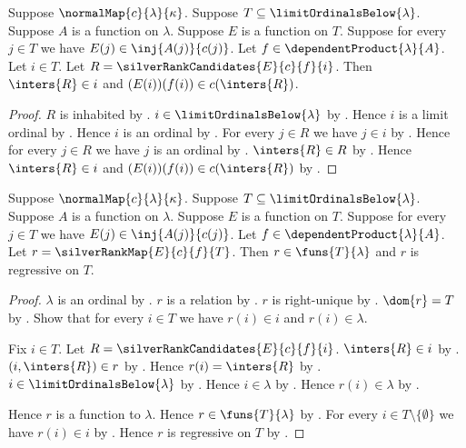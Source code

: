 \begin{proposition}\label{silver_rank_value_properties}
    Suppose $\normalMap{c}{\lambda}{\kappa}$.
    Suppose $T\subseteq\limitOrdinalsBelow{\lambda}$.
    Suppose $A$ is a function on $\lambda$.
    Suppose $E$ is a function on $T$.
    Suppose for every $j\in T$ we have
        $E(j)\in\inj{A(j)}{c(j)}$.
    Let $f\in\dependentProduct{\lambda}{A}$.
    Let $i\in T$.
    Let $R=\silverRankCandidates{E}{c}{f}{i}$.
    Then $\inters{R}\in i$ and $(E(i))(f(i))\in c(\inters{R})$.
\end{proposition}
\begin{proof}
    $R$ is inhabited by .
    $i\in\limitOrdinalsBelow{\lambda}$ by .
    Hence $i$ is a limit ordinal by .
    Hence $i$ is an ordinal by .
    For every $j\in R$ we have $j\in i$
        by .
    Hence for every $j\in R$ we have $j$ is an ordinal
        by .
    $\inters{R}\in R$ by .
    Hence $\inters{R}\in i$ and $(E(i))(f(i))\in c(\inters{R})$
        by .
\end{proof}

\begin{theorem}\label{silver_rank_map_type_and_regressive}
    Suppose $\normalMap{c}{\lambda}{\kappa}$.
    Suppose $T\subseteq\limitOrdinalsBelow{\lambda}$.
    Suppose $A$ is a function on $\lambda$.
    Suppose $E$ is a function on $T$.
    Suppose for every $j\in T$ we have
        $E(j)\in\inj{A(j)}{c(j)}$.
    Let $f\in\dependentProduct{\lambda}{A}$.
    Let $r=\silverRankMap{E}{c}{f}{T}$.
    Then $r\in\funs{T}{\lambda}$ and $r$ is regressive on $T$.
\end{theorem}
\begin{proof}
    $\lambda$ is an ordinal by .
    $r$ is a relation by .
    $r$ is right-unique
        by .
    $\dom{r}=T$
        by .
    Show that for every $i\in T$ we have $r(i)\in i$ and
        $r(i)\in\lambda$.
    \begin{subproof}
        Fix $i\in T$.
        Let $R=\silverRankCandidates{E}{c}{f}{i}$.
        $\inters{R}\in i$ by .
        $(i,\inters{R})\in r$ by .
        Hence $r(i)=\inters{R}$ by .
        $i\in\limitOrdinalsBelow{\lambda}$ by .
        Hence $i\in\lambda$ by .
        Hence $r(i)\in\lambda$ by .
    \end{subproof}
    Hence $r$ is a function to $\lambda$.
    Hence $r\in\funs{T}{\lambda}$ by .
    For every $i\in T\setminus\{\emptyset\}$ we have $r(i)\in i$
        by .
    Hence $r$ is regressive on $T$ by .
\end{proof}

